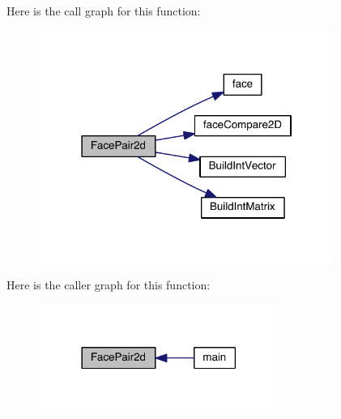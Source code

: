 Here is the call graph for this function\+:\nopagebreak
\begin{figure}[H]
\begin{center}
\leavevmode
\includegraphics[width=274pt]{a00578_a73ad96b82acf2bf80fd24823a58b3f14_cgraph}
\end{center}
\end{figure}
Here is the caller graph for this function\+:\nopagebreak
\begin{figure}[H]
\begin{center}
\leavevmode
\includegraphics[width=222pt]{a00578_a73ad96b82acf2bf80fd24823a58b3f14_icgraph}
\end{center}
\end{figure}
